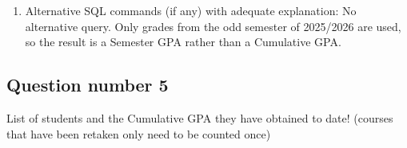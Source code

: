 \begin{enumerate}
    The GPA is calculated using the course credits and grade weights. Students with a GPA of at least 3.25 are selected before the result is rounded to two decimal places.

    \item Alternative SQL commands (if any) with adequate explanation: No alternative query. Only grades from the odd semester of 2025/2026 are used, so the result is a Semester GPA rather than a Cumulative GPA.
\end{enumerate}

\subsection{Question number 5}

\begin{tcolorbox}
    List of students and the Cumulative GPA they have obtained to date! (courses that have been retaken only need to be counted once)
\end{tcolorbox}


